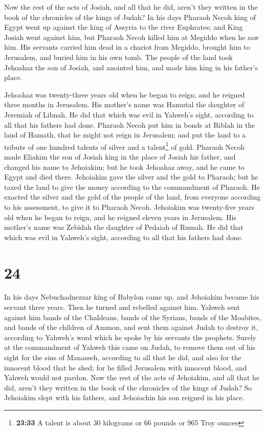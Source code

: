  Now the rest of the acts of Josiah, and all that he did,
aren't they written in the book of the chronicles of the kings of Judah?
 In his days Pharaoh Necoh king of Egypt went up against
the king of Assyria to the river Euphrates; and King Josiah went against
him, but Pharaoh Necoh killed him at Megiddo when he saw him.
 His servants carried him dead in a chariot from Megiddo,
brought him to Jerusalem, and buried him in his own tomb. The people of
the land took Jehoahaz the son of Josiah, and anointed him, and made him
king in his father's place.

 Jehoahaz was twenty-three years old when he began to
reign; and he reigned three months in Jerusalem. His mother's name was
Hamutal the daughter of Jeremiah of Libnah.  He did that
which was evil in Yahweh's sight, according to all that his fathers had
done.  Pharaoh Necoh put him in bonds at Riblah in the
land of Hamath, that he might not reign in Jerusalem; and put the land
to a tribute of one hundred talents of silver and a talent\footnote{\textbf{23:33}
  A talent is about 30 kilograms or 66 pounds or 965 Troy ounces} of
gold.  Pharaoh Necoh made Eliakim the son of Josiah king
in the place of Josiah his father, and changed his name to Jehoiakim;
but he took Jehoahaz away, and he came to Egypt and died there.
 Jehoiakim gave the silver and the gold to Pharaoh; but
he taxed the land to give the money according to the commandment of
Pharaoh. He exacted the silver and the gold of the people of the land,
from everyone according to his assessment, to give it to Pharaoh Necoh.
 Jehoiakim was twenty-five years old when he began to
reign, and he reigned eleven years in Jerusalem. His mother's name was
Zebidah the daughter of Pedaiah of Rumah.  He did that
which was evil in Yahweh's sight, according to all that his fathers had
done.

\hypertarget{section-23}{%
\section{24}\label{section-23}}

 In his days Nebuchadnezzar king of Babylon came up, and
Jehoiakim became his servant three years. Then he turned and rebelled
against him.  Yahweh sent against him bands of the
Chaldeans, bands of the Syrians, bands of the Moabites, and bands of the
children of Ammon, and sent them against Judah to destroy it, according
to Yahweh's word which he spoke by his servants the prophets.
 Surely at the commandment of Yahweh this came on Judah,
to remove them out of his sight for the sins of Manasseh, according to
all that he did,  and also for the innocent blood that he
shed; for he filled Jerusalem with innocent blood, and Yahweh would not
pardon.  Now the rest of the acts of Jehoiakim, and all
that he did, aren't they written in the book of the chronicles of the
kings of Judah?  So Jehoiakim slept with his fathers, and
Jehoiachin his son reigned in his place.


